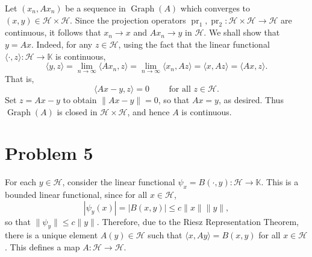 \documentclass[11pt]{article}
\theoremstyle{thmstyle}
\theoremstyle{defstyle}
\newcommand{\R}{\mathbb{R}}
\newcommand{\bbC}{\mathbb{C}}
\newcommand{\K}{\mathbb{K}} %
\renewcommand{\le}{\leqslant}
\newcommand{\calH}{\mathcal{H}}
\begin{document}
Let $(x_n, Ax_n)$ be a sequence in $\operatorname{Graph}(A)$ which converges to $(x, y)\in\calH\times\calH$. Since the projection operators $\operatorname{pr}_1,\operatorname{pr}_2\colon\calH\times\calH\to\calH$ are continuous, it follows that $x_n\to x$ and $Ax_n\to y$ in $\calH$. We shall show that $y = Ax$. Indeed, for any $z\in\calH$, using the fact that the linear functional $\langle\cdot, z\rangle\colon\calH\to\K$ is continuous,
\begin{equation*}
    \langle y, z\rangle = \lim_{n\to\infty}\langle Ax_n, z\rangle = \lim_{n\to\infty}\langle x_n, Az\rangle = \langle x, Az\rangle = \langle Ax, z\rangle.
\end{equation*}
That is, 
\begin{equation*}
    \langle Ax - y, z\rangle = 0\qquad\text{ for all } z\in\calH.
\end{equation*}
Set $z = Ax - y$ to obtain $\|Ax - y\| = 0$, so that $Ax = y$, as desired. Thus $\operatorname{Graph}(A)$ is closed in $\calH\times\calH$, and hence $A$ is continuous.

\section{Problem 5}

For each $y\in\calH$, consider the linear functional $\psi_x = B(\cdot, y)\colon\calH\to\K$. This is a bounded linear functional, since for all $x\in\calH$, 
\begin{equation*}
    \left|\psi_y(x)\right| = \left|B(x, y)\right|\le c\|x\|\|y\|,
\end{equation*}
so that $\|\psi_y\|\le c\|y\|$. Therefore, due to the Riesz Representation Theorem, there is a unique element $A(y)\in\calH$ such that $\langle x, Ay\rangle = B(x, y)$ for all $x\in\calH$. This defines a map $A\colon\calH\to\calH$. 
\end{document}

